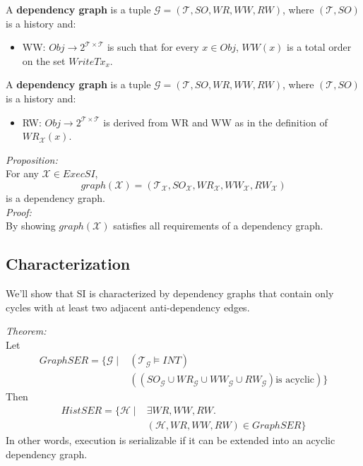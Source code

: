 \documentclass{beamer}
\begin{document}
\begin{frame}
A \textbf{dependency graph} is a tuple $\mathcal{G} = (\mathcal{T}, SO, WR, WW, RW)$, where $(\mathcal{T}, SO)$ is a history and:
	\begin{itemize}
		\item WW: $Obj \rightarrow 2^{\mathcal{T} \times \mathcal{T}}$ is such that for every $x \in Obj$, $WW(x)$ is a total order on the set $WriteTx_x$.
	\end{itemize}
\end{frame}


\begin{frame}
	A \textbf{dependency graph} is a tuple $\mathcal{G} = (\mathcal{T}, SO, WR, WW, RW)$, where $(\mathcal{T}, SO)$ is a history and:
	\begin{itemize}
		\item RW: $Obj \rightarrow 2^{\mathcal{T} \times \mathcal{T}}$ is derived from WR and WW as in the definition of $WR_\mathcal{X}(x)$.
	\end{itemize}
\end{frame}

\begin{frame}
	\textit{Proposition:} \\ 
	For any $\mathcal{X} \in ExecSI$,
	$$
		graph(\mathcal{X}) = (\mathcal{T}_\mathcal{X}, SO_\mathcal{X}, WR_\mathcal{X}, WW_\mathcal{X}, RW_\mathcal{X})
	$$
	is a dependency graph. \\
	
	\emph{Proof:} \\
	By showing $graph(\mathcal{X})$ satisfies all requirements of a dependency graph.
\end{frame}

\subsection{Characterization}

\begin{frame}
	We'll show that SI is characterized by dependency graphs that contain only cycles with at least two adjacent anti-dependency edges.
\end{frame}

\begin{frame}
	\textit{Theorem:} \\
	Let
	$$
	\begin{aligned}
		GraphSER = \{ \mathcal{G} \mid & \left( \mathcal{T}_\mathcal{G} \vDash INT \right) \\
		      & \left(
		      	\left(
		      	 SO_\mathcal{G} \cup WR_\mathcal{G} \cup WW_\mathcal{G} \cup RW_\mathcal{G}
		      	\right) \text{is acyclic}
		        \right) \}
	\end{aligned}
	$$
	Then 
	$$
	\begin{aligned}
		HistSER = \{ \mathcal{H} \mid & \exists WR, WW, RW. \\
		& \left( \mathcal{H}, WR, WW, RW \right) \in GraphSER \}
	\end{aligned}
	$$
	In other words, execution is serializable if it can be extended into an acyclic dependency graph.
\end{frame}
\end{document}
